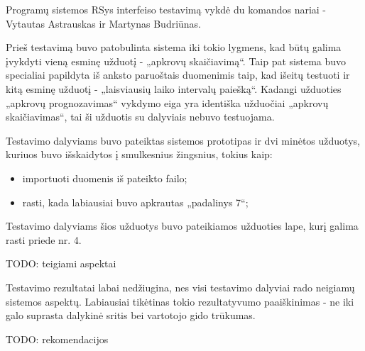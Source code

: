 Programų sistemos RSys interfeiso testavimą vykdė du komandos nariai -
Vytautas Astrauskas ir Martynas Budriūnas.

Prieš testavimą buvo patobulinta sistema iki tokio lygmens, kad būtų galima
įvykdyti vieną esminę užduotį - „apkrovų skaičiavimą“. Taip pat sistema
buvo specialiai papildyta iš anksto paruoštais duomenimis taip, kad išeitų testuoti
ir kitą esminę užduotį - „laisviausių laiko intervalų paiešką“. Kadangi
užduoties „apkrovų prognozavimas“ vykdymo eiga yra identiška užduočiai 
„apkrovų skaičiavimas“, tai ši užduotis su dalyviais nebuvo testuojama.

Testavimo dalyviams buvo pateiktas sistemos prototipas ir dvi minėtos užduotys,
kuriuos buvo išskaidytos į smulkesnius žingsnius, tokius kaip:
\begin{itemize}
  \item importuoti duomenis iš pateikto failo;
  \item rasti, kada labiausiai buvo apkrautas „padalinys 7“;
\end{itemize}

Testavimo dalyviams šios užduotys buvo pateikiamos užduoties lape, kurį galima
rasti priede nr. 4.

TODO: teigiami aspektai

Testavimo rezultatai labai nedžiugina, nes visi testavimo dalyviai rado
neigiamų sistemos aspektų. Labiausiai tikėtinas tokio rezultatyvumo paaiškinimas - 
ne iki galo suprasta dalykinė sritis bei vartotojo gido trūkumas.

TODO: rekomendacijos
